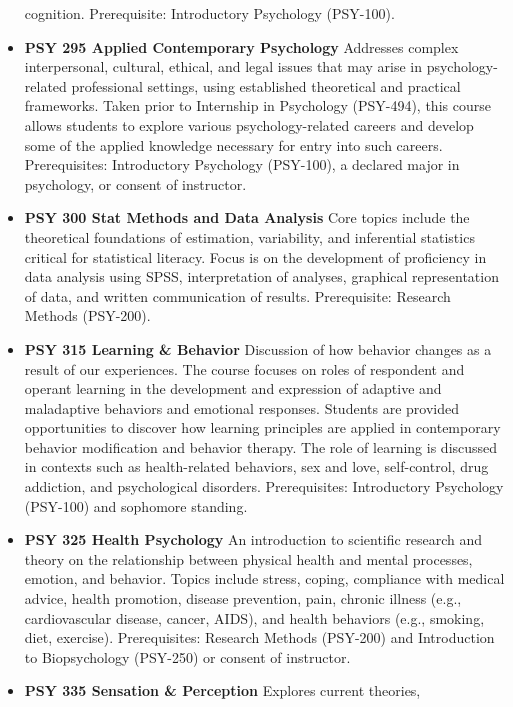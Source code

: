 \documentclass[
  letterpaper,
]{scrbook}
\begin{document}
\begin{itemize}
  cognition. Prerequisite: Introductory Psychology (PSY-100).
\item
  \textbf{PSY 295 Applied Contemporary Psychology} Addresses complex
  interpersonal, cultural, ethical, and legal issues that may arise in
  psychology-related professional settings, using established
  theoretical and practical frameworks. Taken prior to Internship in
  Psychology (PSY-494), this course allows students to explore various
  psychology-related careers and develop some of the applied knowledge
  necessary for entry into such careers. Prerequisites: Introductory
  Psychology (PSY-100), a declared major in psychology, or consent of
  instructor.\\
\item
  \textbf{PSY 300 Stat Methods and Data Analysis} Core topics include
  the theoretical foundations of estimation, variability, and
  inferential statistics critical for statistical literacy. Focus is on
  the development of proficiency in data analysis using SPSS,
  interpretation of analyses, graphical representation of data, and
  written communication of results. Prerequisite: Research Methods
  (PSY-200).
\item
  \textbf{PSY 315 Learning \& Behavior} Discussion of how behavior
  changes as a result of our experiences. The course focuses on roles of
  respondent and operant learning in the development and expression of
  adaptive and maladaptive behaviors and emotional responses. Students
  are provided opportunities to discover how learning principles are
  applied in contemporary behavior modification and behavior therapy.
  The role of learning is discussed in contexts such as health-related
  behaviors, sex and love, self-control, drug addiction, and
  psychological disorders. Prerequisites: Introductory Psychology
  (PSY-100) and sophomore standing.\\
\item
  \textbf{PSY 325 Health Psychology} An introduction to scientific
  research and theory on the relationship between physical health and
  mental processes, emotion, and behavior. Topics include stress,
  coping, compliance with medical advice, health promotion, disease
  prevention, pain, chronic illness (e.g., cardiovascular disease,
  cancer, AIDS), and health behaviors (e.g., smoking, diet, exercise).
  Prerequisites: Research Methods (PSY-200) and Introduction to
  Biopsychology (PSY-250) or consent of instructor.
\item
  \textbf{PSY 335 Sensation \& Perception} Explores current theories,

\end{itemize}
\end{document}
